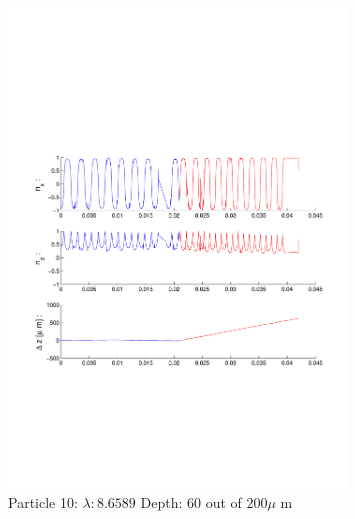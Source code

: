\begin{figure}[H]

\includegraphics[width=0.8\textwidth]{Images/Particle 10/Particle10.pdf}

\caption{Particle 10:  $ \lambda: 8.6589$ Depth: 60 out of $200 \mu $ m}

\centering

\end{figure}

